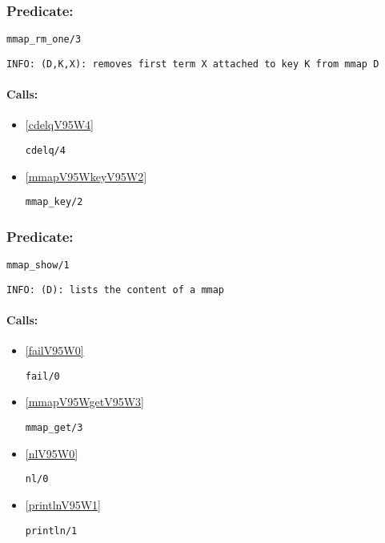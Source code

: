 \subsubsection{Predicate:} \label{mmapV95WrmV95WoneV95W3}

\begin{verbatim}
mmap_rm_one/3
\end{verbatim}

{\small \begin{verbatim}
INFO: (D,K,X): removes first term X attached to key K from mmap D

\end{verbatim}}
\paragraph{Calls:} 
\begin{itemize}
\item \ref{cdelqV95W4} 
\begin{verbatim}
cdelq/4
\end{verbatim}

\item \ref{mmapV95WkeyV95W2} 
\begin{verbatim}
mmap_key/2
\end{verbatim}

\end{itemize}

\subsubsection{Predicate:} \label{mmapV95WshowV95W1}

\begin{verbatim}
mmap_show/1
\end{verbatim}

{\small \begin{verbatim}
INFO: (D): lists the content of a mmap

\end{verbatim}}
\paragraph{Calls:} 
\begin{itemize}
\item \ref{failV95W0} 
\begin{verbatim}
fail/0
\end{verbatim}

\item \ref{mmapV95WgetV95W3} 
\begin{verbatim}
mmap_get/3
\end{verbatim}

\item \ref{nlV95W0} 
\begin{verbatim}
nl/0
\end{verbatim}

\item \ref{printlnV95W1} 
\begin{verbatim}
println/1
\end{verbatim}

\end{itemize}

